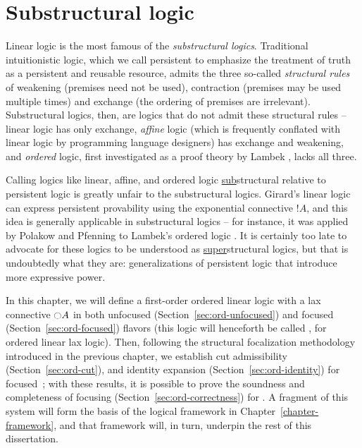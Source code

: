\chapter{Substructural logic}
\label{chapter-order}

Linear logic is the most famous of the {\it substructural logics}.
Traditional intuitionistic logic, which we call persistent to emphasize
the treatment of truth as a persistent and reusable resource, admits
the three so-called {\it structural rules} of weakening (premises need
not be used), contraction (premises may be used multiple times) and
exchange (the ordering of premises are irrelevant). Substructural
logics, then, are logics that do not admit these structural rules --
linear logic has only exchange, {\it affine} logic (which is
frequently conflated with linear logic by programming language
designers) has exchange and weakening, and {\it ordered} logic, first
investigated as a proof theory by Lambek \cite{lambek58mathematics},
lacks all three.

Calling logics like
linear, affine, and ordered logic \underline{sub}structural relative
to persistent logic is greatly unfair to the
substructural logics. Girard's linear logic can express persistent
provability using the exponential connective ${!}A$, and this idea is
generally applicable in substructural logics -- for instance, it was
applied by Polakow and Pfenning to Lambek's ordered logic
\cite{polakow99natural}. It is certainly too
late to advocate for these logics to be understood as
\underline{super}structural logics, but that is undoubtedly what they
are: generalizations of persistent logic that introduce more 
expressive power. 

In this chapter, we will define a first-order ordered linear logic
with a lax connective ${\ocircle}A$ in both unfocused
(Section~\ref{sec:ord-unfocused}) and focused
(Section~\ref{sec:ord-focused}) flavors (this logic will henceforth be
called \ollll, for ordered linear lax logic). Then, following the
structural focalization methodology introduced in the previous
chapter, we establish cut admissibility (Section~\ref{sec:ord-cut}),
and identity expansion (Section~\ref{sec:ord-identity}) for
focused~\ollll; with these results, it is possible to prove the
soundness and completeness of focusing
(Section~\ref{sec:ord-correctness}) for \ollll.  A fragment of this
system will form the basis of the logical framework in
Chapter~\ref{chapter-framework}, and that framework will, in turn,
underpin the rest of this dissertation.

